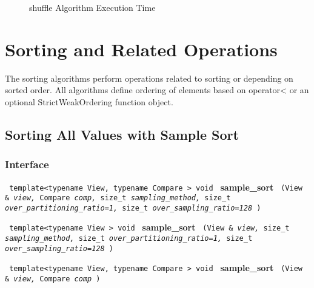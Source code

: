 \begin{figure}[p]
\caption{shuffle Algorithm Execution Time}
\label{fig:shuffle-alg-exec-exper}
\end{figure}



\section{Sorting and Related Operations} \label{sec-sorting-alg}

The sorting algorithms perform operations related to sorting or depending on sorted order. All algorithms define ordering of elements based on operator< or an optional StrictWeakOrdering function object.


\subsection{Sorting All Values with Sample Sort} \label{sec-sort-sample}

\subsubsection{Interface} %

\noindent
\texttt{%
template<typename View, typename Compare >
\newline
void 
}
\newline
\textbf{sample\_sort}%
\texttt{%
(View \&
\textit{view,}%
Compare 
\textit{comp,}%
size\_t 
\textit{sampling\_method,}%
size\_t 
\textit{over\_partitioning\_ratio=1,}%
size\_t 
\textit{over\_sampling\_ratio=128}%
)
}
\vspace{0.4cm}

\noindent
\texttt{%
template<typename View >
\newline
void 
}
\newline
\textbf{sample\_sort}%
\texttt{%
(View \&
\textit{view,}%
size\_t 
\textit{sampling\_method,}%
size\_t 
\textit{over\_partitioning\_ratio=1,}%
size\_t 
\textit{over\_sampling\_ratio=128}%
)
}
\vspace{0.4cm}

\noindent
\texttt{%
template<typename View, typename Compare >
\newline
void 
}
\newline
\textbf{sample\_sort}%
\texttt{%
(View \&
\textit{view,}%
Compare 
\textit{comp}%
)
}
\vspace{0.4cm}

